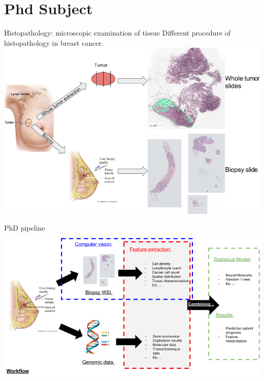 \documentclass{beamer}
\begin{document}
\section{Phd Subject}

\begin{frame}{Histopathology: microscopic examination of tissue}
Different procedure of histopathology in breast cancer.
\includegraphics[width=\textwidth]{SlidePreparation.png}
\end{frame}
\begin{frame}{PhD pipeline}
\includegraphics[width=\textwidth]{Workflow_overview.png}
\end{frame}
\end{document}
